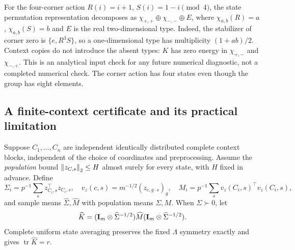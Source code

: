 For the four-corner action $R(i)=i+1$, $S(i)=1-i\pmod4$, the state permutation representation decomposes as $\chi_{+,+}\oplus\chi_{-,-}\oplus E$, where $\chi_{a,b}(R)=a$, $\chi_{a,b}(S)=b$ and $E$ is the real two-dimensional type. Indeed, the stabilizer of corner zero is $\{e,R^3S\}$, so a one-dimensional type has multiplicity $(1+ab)/2$. Context copies do not introduce the absent types: $K$ has zero energy in $\chi_{+,-}$ and $\chi_{-,+}$. This is an analytical input check for any future numerical diagnostic, not a completed numerical check. The corner action has four states even though the group has eight elements.

\subsection{A finite-context certificate and its practical limitation}
\label{sp:certificate}
Suppose $C_1,\ldots,C_n$ are independent identically distributed complete context blocks, independent of the choice of coordinates and preprocessing. Assume the \emph{population} bound $\left\lVert z_{C,s}\right\rVert_2\le H$ almost surely for every state, with $H$ fixed in advance. Define
\[
 \Sigma_i=p^{-1}\sum_sz_{C_i,s}^\top z_{C_i,s},\quad
 v_z(c,s)=m^{-1/2}(z_{c,g\cdot s})_g,\quad
 M_i=p^{-1}\sum_sv_z(C_i,s)^\top v_z(C_i,s),
\]
and sample means $\widehat\Sigma,\widehat M$ with population means $\Sigma,M$. When $\widehat\Sigma\succ0$, let
\[
 \widehat K=(\mathbf{I}_m\otimes\widehat\Sigma^{-1/2})\widehat M
                    (\mathbf{I}_m\otimes\widehat\Sigma^{-1/2}).
\]
Complete uniform state averaging preserves the fixed $\Lambda$ symmetry exactly and gives $\operatorname{tr}\widehat K=r$.

